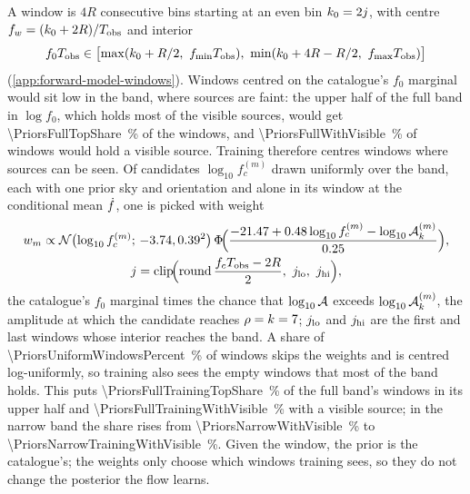 A window is $4R$ consecutive bins starting at an even bin $k_0 = 2{}j$, with centre
$f_{w} = (k_0 + 2R)/T_{\rm obs}$ and interior
\begin{equation}
  f_0\Tobs \in \bigl[\max(k_0 + R/2,\ f_{\min}\Tobs),\ \min(k_0 + 4R - R/2,\ f_{\max}\Tobs)\bigr]
  \label{eq:priors-interior}
\end{equation}
(\cref{app:forward-model-windows}). Windows centred on the catalogue's $f_0$ marginal would sit low in
the band, where sources are faint: the upper half of the full band in $\log f_0$, which holds most of
the visible sources, would get \qty{\PriorsFullTopShare}{\percent} of the windows, and
\qty{\PriorsFullWithVisible}{\percent} of windows would hold a visible source. Training therefore
centres windows where sources can be seen. Of \PriorsCandidates{} candidates $\log_{10}f_c^{(m)}$
drawn uniformly over the band, each with one prior sky and orientation and alone in its window at the
conditional mean $\dot f$, one is picked with weight
\begin{equation}
\begin{gathered}
  w_m \propto \mathcal{N}\bigl(\log_{10}f_c^{(m)};\, -3.74, 0.39^2\bigr)\,
  \Phi\!\Bigl(\frac{-21.47 + 0.48\log_{10}f_c^{(m)} - \log_{10}\mathcal{A}_k^{(m)}}{0.25}\Bigr),\\
  j = \operatorname{clip}\!\Bigl(\operatorname{round}\frac{f_cT_{\rm obs} - 2R}{2{}},\ j_{\rm lo},\ j_{\rm hi}\Bigr),
\end{gathered}
  \label{eq:priors-window}
\end{equation}
the catalogue's $f_0$ marginal times the chance that $\log_{10}\mathcal{A}$ exceeds $\log_{10}\mathcal{A}_k^{(m)}$,
the amplitude at which the candidate reaches $\rho=k=7$; $j_{\rm lo}$ and
$j_{\rm hi}$ are the first and last windows whose interior reaches the band. A share of
\qty{\PriorsUniformWindowsPercent}{\percent} of windows skips the weights and is centred
log-uniformly, so training also sees the empty windows that most of the band holds. This puts
\qty{\PriorsFullTrainingTopShare}{\percent} of the full band's windows in its upper half and
\qty{\PriorsFullTrainingWithVisible}{\percent} with a visible source; in the narrow band the share
rises from \qty{\PriorsNarrowWithVisible}{\percent} to \qty{\PriorsNarrowTrainingWithVisible}{\percent}.
Given the window, the prior is the catalogue's; the weights only choose which windows training sees,
so they do not change the posterior the flow learns.

